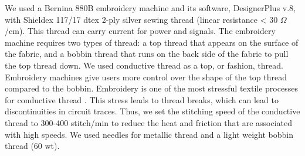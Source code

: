 \documentclass[header.tex]{subfiles}
\begin{document}
We used a Bernina 880B
embroidery machine and its software, DesignerPlus v.8, with Shieldex 117/17 dtex 2-ply silver sewing thread (linear resistance < 30 $\Omega$/cm). 
This thread can carry current for power and signals. The embroidery machine requires two types of thread: a top thread that appears on the surface of the fabric, and a bobbin thread that runs on the back side of the fabric to pull the top thread down. We used conductive thread as a top, or fashion, thread. Embroidery machines give users more control over the shape of the top thread compared to the bobbin. Embroidery is one of the most stressful textile processes for conductive thread \cite{5387040}. This stress leads to thread breaks, which can lead to discontinuities in circuit traces. Thus, we set the stitching speed of the conductive thread to 300-400 stitch/min to reduce the heat and friction that are associated with high speeds. We used needles for metallic thread and a light weight bobbin thread (60 wt).  

\begin{table}[]
\centering
{}
\caption{ }
\label{tab:Stitches}
\vspace{-1.5em}
\end{table} 
\end{document}
